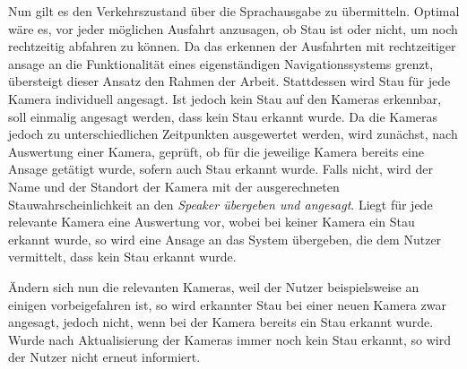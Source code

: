 Nun gilt es den Verkehrszustand über die Sprachausgabe zu übermitteln.
Optimal wäre es, vor jeder möglichen Ausfahrt anzusagen, ob Stau ist oder nicht, um noch rechtzeitig abfahren zu können.
Da das erkennen der Ausfahrten mit rechtzeitiger ansage an die Funktionalität eines eigenständigen Navigationssystems grenzt, übersteigt dieser Ansatz den Rahmen der Arbeit.
Stattdessen wird Stau für jede Kamera individuell angesagt.
Ist jedoch kein Stau auf den Kameras erkennbar, soll einmalig angesagt werden, dass kein Stau erkannt wurde.
Da die Kameras jedoch zu unterschiedlichen Zeitpunkten ausgewertet werden, wird zunächst, nach Auswertung einer Kamera, geprüft, ob für die jeweilige Kamera bereits eine Ansage getätigt wurde, sofern auch Stau erkannt wurde. Falls nicht, wird der Name und der Standort der Kamera mit der ausgerechneten Stauwahrscheinlichkeit an den {\em Speaker übergeben und angesagt}. Liegt für jede relevante Kamera eine Auswertung vor, wobei bei keiner Kamera ein Stau erkannt wurde, so wird eine Ansage an das System übergeben, die dem Nutzer vermittelt, dass kein Stau erkannt wurde.

Ändern sich nun die relevanten Kameras, weil der Nutzer beispielsweise an einigen vorbeigefahren ist, so wird erkannter Stau bei einer neuen Kamera zwar angesagt, jedoch nicht, wenn bei der Kamera bereits ein Stau erkannt wurde. Wurde nach Aktualisierung der Kameras immer noch kein Stau erkannt, so wird der Nutzer nicht erneut informiert.